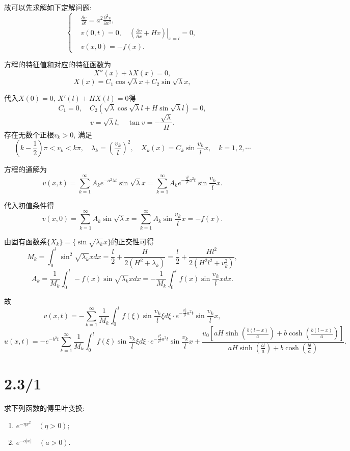 \documentclass[11pt,a4paper]{article}
\begin{document}
故可以先求解如下定解问题:
$$\left\{\begin{aligned}
     & \frac{\partial v}{\partial t}=a^2\frac{\partial^2v}{\partial x^2},                 \\
     & v(0,t)=0,\quad \left.\left(\frac{\partial v}{\partial x}+Hv\right)\right|_{x=l}=0, \\
     & v(x,0)=-f(x).
  \end{aligned}\right.$$

方程的特征值和对应的特征函数为
$$X''(x)+\lambda X(x)=0,$$
$$X(x)=C_1\cos\sqrt{\lambda}x+C_2\sin\sqrt{\lambda}x,$$

代入$X(0)=0$, $X'(l)+HX(l)=0$得
$$C_1=0,\quad C_2(\sqrt{\lambda}\cos\sqrt{\lambda}l+H\sin\sqrt{\lambda}l)=0,$$
$$v=\sqrt{\lambda}l,\quad \tan v=-\frac{\sqrt{\lambda}}{H}.$$
存在无数个正根$v_k>0$, 满足
$$\left(k-\frac{1}{2}\right)\pi<v_k<k\pi,\quad \lambda_k=\left(\frac{v_k}{l}\right)^2,\quad X_k(x)=C_k\sin\frac{v_k}{l}x,\quad k=1,2,\cdots$$

方程的通解为
$$v(x,t)=\sum_{k=1}^\infty A_ke^{-a^2\lambda t}\sin\sqrt{\lambda}x=\sum_{k=1}^\infty A_ke^{-\frac{v_k^2}{l^2}a^2t}\sin \frac{v_k}{l} x.$$

代入初值条件得
$$v(x,0)=\sum_{k=1}^\infty A_k\sin\sqrt{\lambda}x=\sum_{k=1}^\infty A_k\sin \frac{v_k}{l} x=-f(x).$$

由固有函数系$\{X_k\}=\{\sin\sqrt{\lambda_k}x\}$的正交性可得
$$M_k=\int_0^l\sin^2\sqrt{\lambda_k}xdx=\frac{l}{2}+\frac{H}{2(H^2+\lambda_k)}=\frac{l}{2}+\frac{Hl^2}{2(H^2l^2+v_k^2)},$$
$$A_k=\frac{1}{M_k}\int_0^l -f(x)\sin\sqrt{\lambda_k}xdx=-\frac{1}{M_k}\int_0^l f(x)\sin\frac{v_k}{l}xdx.$$

故
$$v(x,t)=-\sum_{k=1}^\infty \frac{1}{M_k}\int_0^l f(\xi)\sin\frac{v_k}{l}\xi d\xi \cdot e^{-\frac{v_k^2}{l^2}a^2t}\sin \frac{v_k}{l} x,$$
$$u(x,t)=-e^{-b^2t}\sum_{k=1}^\infty \frac{1}{M_k}\int_0^l f(\xi)\sin\frac{v_k}{l}\xi d\xi \cdot e^{-\frac{v_k^2}{l^2}a^2t}\sin \frac{v_k}{l} x+\frac{u_0 \left[a H \sinh \left(\frac{b (l-x)}{a}\right)+b \cosh \left(\frac{b (l-x)}{a}\right)\right]}{a H \sinh \left(\frac{b l}{a}\right)+b \cosh \left(\frac{b l}{a}\right)}.$$

\section{2.3/1}
\begin{problem}
求下列函数的傅里叶变换:
\begin{enumerate}
  \item $e^{-\eta x^2}\quad (\eta>0)$;
  \item $e^{-a|x|}\quad (a>0)$.
\end{enumerate}
\end{problem}
\end{document}
